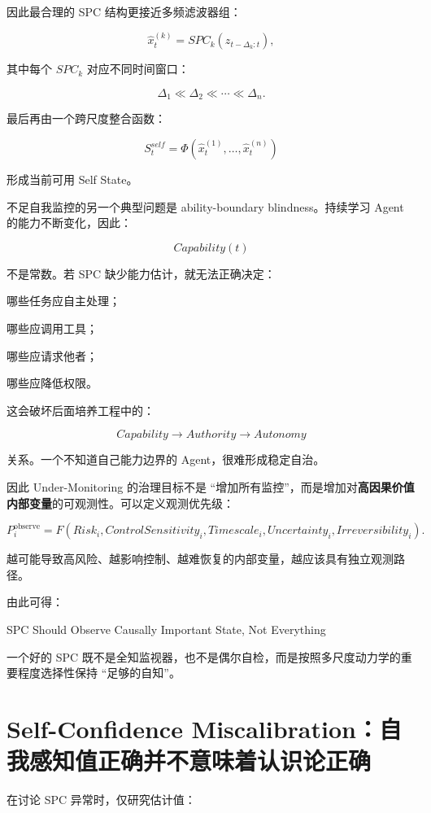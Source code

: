 因此最合理的 SPC 结构更接近多频滤波器组：

\[
\hat{x}^{(k)}_t
=
SPC_k
\left(
z_{t-\Delta_k:t}
\right),
\]

其中每个 $SPC_k$ 对应不同时间窗口：

\[
\Delta_1
\ll
\Delta_2
\ll
\cdots
\ll
\Delta_n.
\]

最后再由一个跨尺度整合函数：

\[
S_t^{self}
=
\Phi
\left(
\hat{x}^{(1)}_t,\ldots,\hat{x}^{(n)}_t
\right)
\]

形成当前可用 Self State。

不足自我监控的另一个典型问题是 ability-boundary blindness。持续学习 Agent 的能力不断变化，因此：

\[
Capability(t)
\]

不是常数。若 SPC 缺少能力估计，就无法正确决定：

哪些任务应自主处理；

哪些应调用工具；

哪些应请求他者；

哪些应降低权限。

这会破坏后面培养工程中的：

\[
Capability
\rightarrow
Authority
\rightarrow
Autonomy
\]

关系。一个不知道自己能力边界的 Agent，很难形成稳定自治。

因此 Under-Monitoring 的治理目标不是 ``增加所有监控''，而是增加对\textbf{高因果价值内部变量}的可观测性。可以定义观测优先级：

\[
P_i^{\mathrm{observe}}
=
F(
Risk_i,
ControlSensitivity_i,
Timescale_i,
Uncertainty_i,
Irreversibility_i
).
\]

越可能导致高风险、越影响控制、越难恢复的内部变量，越应该具有独立观测路径。

由此可得：

\begin{statementbox}
SPC Should Observe Causally Important State, Not Everything
\end{statementbox}

一个好的 SPC 既不是全知监视器，也不是偶尔自检，而是按照多尺度动力学的重要程度选择性保持 ``足够的自知''。

\section{Self-Confidence Miscalibration：自我感知值正确并不意味着认识论正确}

在讨论 SPC 异常时，仅研究估计值：

